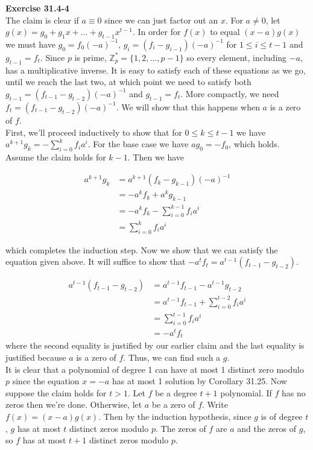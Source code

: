\documentclass{article}
\begin{document}
\noindent\textbf{Exercise 31.4-4}\\

The claim is clear if $a \equiv 0$ since we can just factor out an $x$.  For $a \neq 0$, let $g(x) = g_0 + g_1x + \ldots + g_{t-1}x^{t-1}$.  In order for $f(x)$ to equal $(x-a)g(x)$ we must have $g_0 = f_0(-a)^{-1}$, $g_i = (f_i - g_{i-1})(-a)^{-1}$ for $1 \leq i \leq t-1$ and $g_{t-1}=f_t$.  Since $p$ is prime, $\mathbb{Z}_p^* = \{1,2,\ldots,p-1\}$ so every element, including $-a$, has a multiplicative inverse.  It is easy to satisfy each of these equations as we go, until we reach the last two, at which point we need to satisfy both $g_{t-1} = (f_{t-1}-g_{t-2})(-a)^{-1}$ and $g_{t-1} = f_t$.  More compactly, we need $f_t = (f_{t-1}-g_{t-2})(-a)^{-1}$. We will show that this happens when $a$ is a zero of $f$. \\

First, we'll proceed inductively to show that for $0 \leq k \leq t-1$ we have $a^{k+1}g_k = -\sum_{i=0}^k f_ia^i$.  For the base case we have $ag_0 = -f_0$, which holds.  Assume the claim holds for $k-1$. Then we have

\begin{align*}
a^{k+1}g_k &= a^{k+1} (f_k - g_{k-1})(-a)^{-1} \\
&= -a^kf_k + a^kg_{k-1} \\
&= -a^kf_k - \sum_{i=0}^{k-1}f_ia^i \\
&= \sum_{i=0}^k f_ia^i
\end{align*}

which completes the induction step.  Now we show that we can satisfy the equation given above. It will suffice to show that $-a^tf_t = a^{t-1}(f_{t-1}-g_{t-2})$.

\begin{align*} a^{t-1}(f_{t-1}-g_{t-2}) &= a^{t-1}f_{t-1} - a^{t-1}g_{t-2}\\
& = a^{t-1}f_{t-1} + \sum_{i=0}^{t-2}f_ia^i \\
&= \sum_{i=0}^{t-1}f_ia^i \\
&= -a^tf_t
\end{align*}
where the second equality is justified by our earlier claim and the last equality is justified because $a$ is a zero of $f$.  Thus, we can find such a $g$. \\

It is clear that a polynomial of degree 1 can have at most 1 distinct zero modulo $p$ since the equation $x=-a$ has at most 1 solution by Corollary 31.25. Now suppose the claim holds for $t > 1$.  Let $f$ be a degree $t+1$ polynomial. If $f$ has no zeros then we're done.  Otherwise, let $a$ be a zero of $f$.  Write $f(x) = (x-a)g(x)$. Then by the induction hypothesis, since $g$ is of degree $t$, $g$ has at most $t$ distinct zeros modulo $p$. The zeros of $f$ are $a$ and the zeros of $g$, so $f$ has at most $t+1$ distinct zeros modulo $p$. \\
\end{document}
